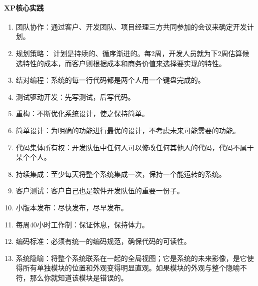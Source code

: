 \documentclass[letterpaper,10pt,english]{sphinxmanual}
\begin{document}
\paragraph{XP核心实践}
\label{\detokenize{chapter_project/Scrum:xp}}\begin{enumerate}
%
\item {} 
团队协作：通过客户、开发团队、项目经理三方共同参加的会议来确定开发计划。

\item {} 
规划策略：
计划是持续的、循序渐进的。每2周，开发人员就为下2周估算候选特性的成本，而客户则根据成本和商务价值来选择要实现的特性。

\item {} 
结对编程：系统的每一行代码都是两个人用一个键盘完成的。

\item {} 
测试驱动开发：先写测试，后写代码。

\item {} 
重构：不断优化系统设计，使之保持简单。

\item {} 
简单设计：为明确的功能进行最优的设计，不考虑未来可能需要的功能。

\item {} 
代码集体所有权：开发队伍中任何人可以修改任何其他人的代码，代码不属于某个个人。

\item {} 
持续集成：至少每天将整个系统集成一次，保持一个能运转的系统。

\item {} 
客户测试：客户自己也是软件开发队伍的重要一份子。

\item {} 
小版本发布：尽快发布，尽早发布。

\item {} 
每周40小时工作制：保证休息，保持体力。

\item {} 
编码标准：必须有统一的编码规范，确保代码的可读性。

\item {} 
系统隐喻：将整个系统联系在一起的全局视图；它是系统的未来影像，是它使得所有单独模块的位置和外观变得明显直观。如果模块的外观与整个隐喻不符，那么你就知道该模块是错误的。
%
\begin{footnote}[817]\sphinxAtStartFootnote
{}
%
\end{footnote}

\end{enumerate}
\end{document}
